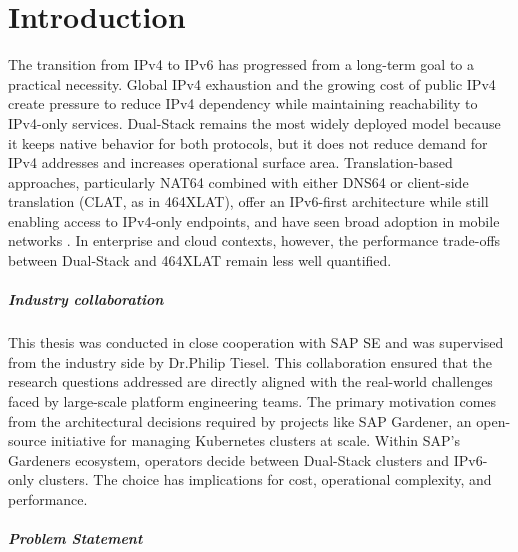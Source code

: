 \chapter{Introduction}
The transition from IPv4 to IPv6 has progressed from a long-term goal to a practical necessity. Global IPv4 exhaustion and the growing cost of public IPv4 create pressure to reduce IPv4 dependency while maintaining reachability to IPv4-only services\cite{7737362,LEVIN20141059}. Dual-Stack remains the most widely deployed model because it keeps native behavior for both protocols, but it does not reduce demand for IPv4 addresses and increases operational surface area\cite{rfc4213}. 
Translation-based approaches, particularly NAT64 combined with either DNS64 or client-side translation (CLAT, as in 464XLAT), offer an IPv6-first architecture while still enabling access to IPv4-only endpoints, and have seen broad adoption in mobile networks \cite{rfc6146,rfc6147,rfc6877}. In enterprise and cloud contexts, however, the performance trade-offs between Dual-Stack and 464XLAT remain less well quantified.

\paragraph{Industry collaboration }
This thesis was conducted in close cooperation with SAP SE and was supervised from the industry side by Dr.Philip Tiesel. This collaboration ensured that the research questions addressed are directly aligned with the real-world challenges faced by large-scale platform engineering teams. The primary motivation comes from the architectural decisions required by projects like SAP Gardener, an open-source initiative for managing Kubernetes clusters at scale\cite{gardener_docs}. Within SAP’s Gardeners ecosystem, operators decide between Dual-Stack clusters and IPv6-only clusters. The choice has implications for cost, operational complexity, and performance. 

\paragraph{Problem Statement}


